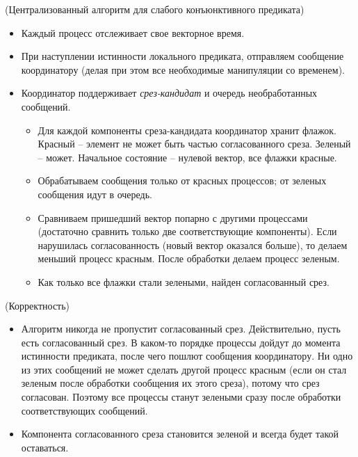 \begin{algorithm}(Централизованный алгоритм для слабого конъюнктивного предиката)
    \enewline
    \begin{itemize}
        \item Каждый процесс отслеживает свое векторное время.
        \item При наступлении истинности локального предиката,
            отправляем сообщение координатору (делая при этом все
            необходимые манипуляции со временем).
        \item Координатор поддерживает \textit{срез-кандидат} и
            очередь необработанных сообщений.
            \begin{itemize}
                \item Для каждой компоненты среза-кандидата координатор хранит
                    флажок. Красный -- элемент не может быть частью согласованного
                    среза. Зеленый -- может. Начальное состояние -- нулевой вектор,
                    все флажки красные.
                \item Обрабатываем сообщения только от красных процессов; от зеленых
                    сообщения идут в очередь.
                \item Сравниваем пришедший вектор попарно с другими процессами
                    (достаточно сравнить только две соответствующие компоненты).
                    Если нарушилась согласованность (новый вектор оказался больше),
                    то делаем меньший процесс красным. После обработки делаем
                    процесс зеленым.
                \item Как только все флажки стали зелеными, найден согласованный срез.
            \end{itemize}
    \end{itemize}
\end{algorithm}

\begin{theorem}(Корректность)
    \enewline
    \begin{itemize}
        \item Алгоритм никогда не пропустит согласованный срез. Действительно,
            пусть есть согласованный срез. В каком-то порядке процессы дойдут
            до момента истинности предиката, после чего пошлют сообщения координатору.
            Ни одно из этих сообщений не может сделать другой процесс красным
            (если он стал зеленым после обработки сообщения их этого среза),
            потому что срез согласован. Поэтому все процессы станут зелеными
            сразу после обработки соответствующих сообщений.
        \item Компонента согласованного среза становится зеленой
            и всегда будет такой оставаться.
    \end{itemize}
\end{theorem}

